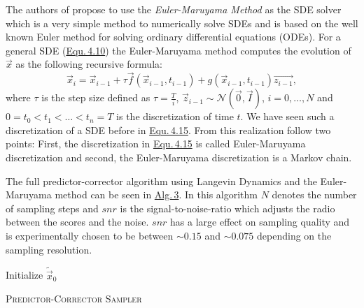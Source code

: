 The authors of \cite{score_3} propose to use the \textit{Euler-Maruyama Method} as the SDE solver which is a very simple method to numerically solve SDEs and is based on the well known Euler method for solving ordinary differential equations (ODEs). For a general SDE (\hyperref[equ:4.10]{Equ.\,4.10}) the Euler-Maruyama method computes the evolution of $\vec{x}$ as the following recursive formula:
%
\begin{equation} \label{equ:4.20}
    \vec{x}_i=\vec{x}_{i-1}+\tau\vec{f}(\vec{x}_{i-1}, t_{i-1})+g(\vec{x}_{i-1}, t_{i-1})\vec{z_{i-1}},
\end{equation}
%
where $\tau$ is the step size defined as $\tau=\frac{T}{i}$, $\vec{z}_{i-1}\sim\mathcal{N}(\vec{0},\vec{I})$, $i=0,\dots,N$ and $0=t_0<t_1<\dots<t_n=T$ is the discretization of time $t$. We have seen such a discretization of a SDE before in \hyperref[equ:4.15]{Equ.\,4.15}. From this realization follow two points: First, the discretization in \hyperref[equ:4.15]{Equ.\,4.15} is called Euler-Maruyama discretization and second, the Euler-Maruyama discretization is a Markov chain.

The full predictor-corrector algorithm using Langevin Dynamics and the Euler-Maruyama method can be seen in \hyperref[alg:3]{Alg.\,3}. In this algorithm $N$ denotes the number of sampling steps and $snr$ is the signal-to-noise-ratio which adjusts the radio between the scores and the noise. $snr$ has a large effect on sampling quality and is experimentally chosen to be between $\sim0.15$ and $\sim0.075$ depending on the sampling resolution. 
%
\begin{algorithm} \label{alg:3}
    \DontPrintSemicolon
    Initialize $\tilde{\vec{x}}_0$\;

    
    \caption{\textsc{Predictor-Corrector Sampler}}
\end{algorithm}
%
